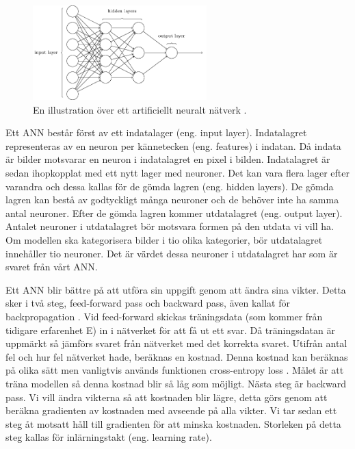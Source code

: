 \documentclass[]{kththesis}
\begin{document}
\begin{figure}[h]
  \centering
  \includegraphics[width=0.6\textwidth]{nn}
  \caption{En illustration över ett artificiellt neuralt nätverk \parencite{nielsen2015neural}.}
\end{figure}

Ett ANN består först av ett indatalager (eng. input layer). Indatalagret representeras av en neuron per kännetecken (eng. features) i indatan. Då indata är bilder motsvarar en neuron i indatalagret en pixel i bilden. Indatalagret är sedan ihopkopplat med ett nytt lager med neuroner. Det kan vara flera lager efter varandra och dessa kallas för de gömda lagren (eng. hidden layers). De gömda lagren kan bestå av godtyckligt många neuroner och de behöver inte ha samma antal neuroner. Efter de gömda lagren kommer utdatalagret (eng. output layer). Antalet neuroner i utdatalagret bör motsvara formen på den utdata vi vill ha. Om modellen ska kategorisera bilder i tio olika kategorier, bör utdatalagret innehåller tio neuroner. Det är värdet dessa neuroner i utdatalagret har som är svaret från vårt ANN.

Ett ANN blir bättre på att utföra sin uppgift genom att ändra sina vikter. Detta sker i två steg, feed-forward pass och backward pass, även kallat för backpropagation \parencite{alpaydin2009introduction}. Vid feed-forward skickas träningsdata (som kommer från tidigare erfarenhet E) in i nätverket för att få ut ett svar. Då träningsdatan är uppmärkt så jämförs svaret från nätverket med det korrekta svaret. Utifrån antal fel och hur fel nätverket hade, beräknas en kostnad. Denna kostnad kan beräknas på olika sätt men vanligtvis används funktionen cross-entropy loss \parencite{Goodfellow-et-al-2016}. Målet är att träna modellen så denna kostnad blir så låg som möjligt. Nästa steg är backward pass. Vi vill ändra vikterna så att kostnaden blir lägre, detta görs genom att beräkna gradienten av kostnaden med avseende på alla vikter. Vi tar sedan ett steg åt motsatt håll till gradienten för att minska kostnaden. Storleken på detta steg kallas för inlärningstakt (eng. learning rate).
\end{document}
